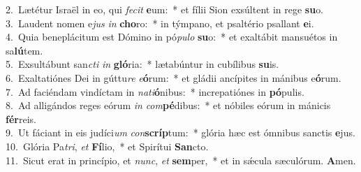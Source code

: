 {2.~}Lætétur Israël in eo, qui \textit{fe}\textit{cit} \textbf{e}um:~* et fílii Sion exsúltent in rege \textbf{su}o.\\
{3.~}Laudent nomen e\textit{jus} \textit{in} \textbf{cho}ro:~* in týmpano, et psaltério psallant \textbf{e}i.\\
{4.~}Quia beneplácitum est Dómino in pó\textit{pu}\textit{lo} \textbf{su}o:~* et exaltábit mansuétos in sa\textbf{lú}tem.\\
{5.~}Exsultábunt san\textit{cti} \textit{in} \textbf{gló}ria:~* lætabúntur in cubílibus \textbf{su}is.\\
{6.~}Exaltatiónes Dei in gúttu\textit{re} \textit{e}\textbf{ó}rum:~* et gládii ancípites in mánibus e\textbf{ó}rum.\\
{7.~}Ad faciéndam vindíctam in \textit{na}\textit{ti}\textbf{ó}nibus:~* increpatiónes in \textbf{pó}pulis.\\
{8.~}Ad alligándos reges eórum \textit{in} \textit{com}\textbf{pé}dibus:~* et nóbiles eórum in mánicis \textbf{fér}reis.\\
{9.~}Ut fáciant in eis judíci\textit{um} \textit{con}\textbf{scríp}tum:~* glória hæc est ómnibus sanctis \textbf{e}jus.\\
{10.~}Glória Pa\textit{tri}, \textit{et} \textbf{Fí}lio,~* et Spirítui \textbf{San}cto.\\
{11.~}Sicut erat in princípio, et \textit{nunc}, \textit{et} \textbf{sem}per,~* et in sǽcula sæculórum. \textbf{A}men.\\
